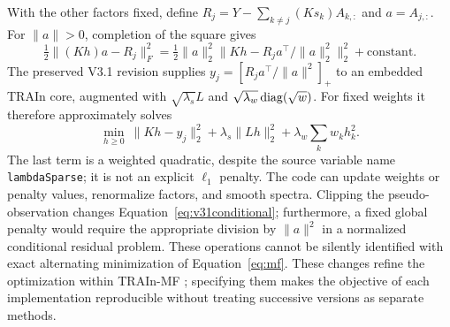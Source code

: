 With the other factors fixed, define $R_j=Y-\sum_{k\ne j}(Ks_k)A_{k,:}$ and $a=A_{j,:}$. For $\|a\|>0$, completion of the square gives
\begin{equation}\label{eq:v31conditional}
 \tfrac12\|(Kh)a-R_j\|_F^2
 =\tfrac12\|a\|_2^2\|Kh-R_ja^\top/\|a\|_2^2\|_2^2+\mathrm{constant}.
\end{equation}
The preserved V3.1 revision supplies $y_j=[R_ja^\top/\|a\|^2]_+$ to an embedded TRAIn core, augmented with $\sqrt{\lambda_s}L$ and $\sqrt{\lambda_w}\operatorname{diag}(\sqrt w)$. For fixed weights it therefore approximately solves
\begin{equation}\label{eq:v31penalty}
 \min_{h\geq0}\ \|Kh-y_j\|_2^2+\lambda_s\|Lh\|_2^2
                       +\lambda_w\sum_k w_k h_k^2.
\end{equation}
The last term is a weighted quadratic, despite the source variable name \texttt{lambdaSparse}; it is not an explicit $\ell_1$ penalty. The code can update weights or penalty values, renormalize factors, and smooth spectra. Clipping the pseudo-observation changes Equation~\eqref{eq:v31conditional}; furthermore, a fixed global penalty would require the appropriate division by $\|a\|^2$ in a normalized conditional residual problem. These operations cannot be silently identified with exact alternating minimization of Equation~\eqref{eq:mf}. These changes refine the optimization within TRAIn-MF \cite{train,mfv31,software}; specifying them makes the objective of each implementation reproducible without treating successive versions as separate methods.
